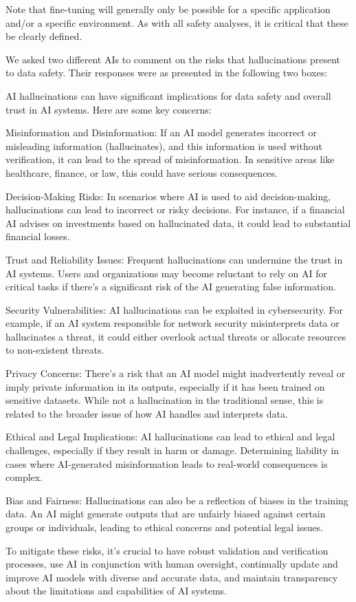 Note that fine-tuning will generally only be possible for a specific application and/or a specific
environment. As with all safety analyses, it is critical that these be clearly defined.

We asked two different AIs to comment on the risks that hallucinations present to data safety. Their responses were as presented in the
following two boxes:

\begin{aibox}%
  AI hallucinations can have significant implications for data safety and overall trust in AI systems. Here are some key concerns:

Misinformation and Disinformation: If an AI model generates incorrect or misleading information (hallucinates), and this information is used without verification, it can lead to the spread of misinformation. In sensitive areas like healthcare, finance, or law, this could have serious consequences.

Decision-Making Risks: In scenarios where AI is used to aid decision-making, hallucinations can lead to incorrect or risky decisions. For instance, if a financial AI advises on investments based on hallucinated data, it could lead to substantial financial losses.

Trust and Reliability Issues: Frequent hallucinations can undermine the trust in AI systems. Users and organizations may become reluctant to rely on AI for critical tasks if there's a significant risk of the AI generating false information.

Security Vulnerabilities: AI hallucinations can be exploited in cybersecurity. For example, if an AI system responsible for network security misinterprets data or hallucinates a threat, it could either overlook actual threats or allocate resources to non-existent threats.

Privacy Concerns: There’s a risk that an AI model might inadvertently reveal or imply private information in its outputs, especially if it has been trained on sensitive datasets. While not a hallucination in the traditional sense, this is related to the broader issue of how AI handles and interprets data.

Ethical and Legal Implications: AI hallucinations can lead to ethical and legal challenges, especially if they result in harm or damage. Determining liability in cases where AI-generated misinformation leads to real-world consequences is complex.

Bias and Fairness: Hallucinations can also be a reflection of biases in the training data. An AI might generate outputs that are unfairly biased against certain groups or individuals, leading to ethical concerns and potential legal issues.

To mitigate these risks, it's crucial to have robust validation and verification processes, use AI in conjunction with human oversight, continually update and improve AI models with diverse and accurate data, and maintain transparency about the limitations and capabilities of AI systems.
\end{aibox}


